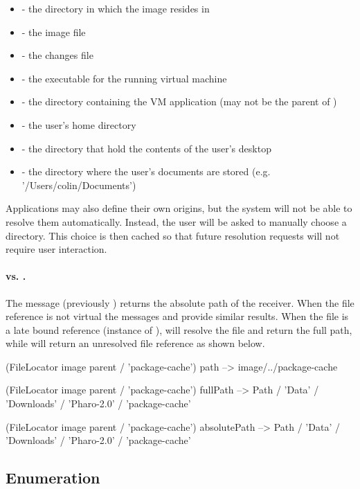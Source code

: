 \documentclass[a4paper,10pt,twoside]{book}
\begin{document}
\begin{itemize}
\item {} - the directory in which the image resides in
\item{} - the image file
\item{} - the changes file
\item{} - the executable for the running virtual machine
\item{} - the directory containing the VM application (may not be the parent of )
\item{} - the user's home directory
\item{} - the directory that hold the contents of the user's desktop
\item{} - the directory where the user's documents are stored (e.g. '/Users/colin/Documents')
\end{itemize}

Applications may also define their own origins, but the system will not be able to resolve them automatically. Instead, the user will be asked to manually choose a directory. This choice is then cached so that future resolution requests will not require user interaction.

\paragraph{ vs. .} The message   (previously ) returns the absolute path of the receiver. When the file reference is not virtual the messages  and  provide similar results.
When the file is a late bound reference (instance of ),  will resolve the file and return the full path, while  will return an unresolved file reference as shown below.


\begin{code}{}
(FileLocator image parent / 'package-cache') path
--> {image}/../package-cache

(FileLocator image parent / 'package-cache') fullPath
--> Path / 'Data' / 'Downloads' / 'Pharo-2.0' / 'package-cache'

(FileLocator image parent / 'package-cache') absolutePath
--> Path / 'Data' / 'Downloads' / 'Pharo-2.0' / 'package-cache'
\end{code}


\subsection{Enumeration}
\end{document}
